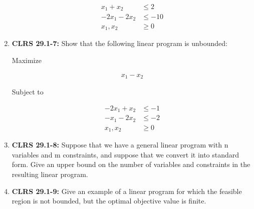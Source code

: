 \documentclass[12pt]{article}
\begin{document}
\begin{enumerate}[1.]
    \begin{align*}
        x_1 + x_2 &\leq 2\\
        -2x_1 - 2x_2 &\leq -10\\
        x_1, x_2 &\geq 0
    \end{align*}

    \item \textbf{CLRS 29.1-7:} Show that the following linear program is unbounded:

    \bigskip

    Maximize

    \begin{align*}
        x_1 - x_2
    \end{align*}

    Subject to

    \begin{align*}
        -2x_1 + x_2 &\leq -1\\
        -x_1 - 2x_2 &\leq -2\\
        x_1,x_2 &\geq 0
    \end{align*}

    \item \textbf{CLRS 29.1-8:} Suppose that we have a general linear program with n variables and m constraints,
    and suppose that we convert it into standard form. Give an upper bound on the
    number of variables and constraints in the resulting linear program.

    \item \textbf{CLRS 29.1-9:} Give an example of a linear program for which the feasible region is not bounded,
    but the optimal objective value is finite.
\end{enumerate}
\end{document}

